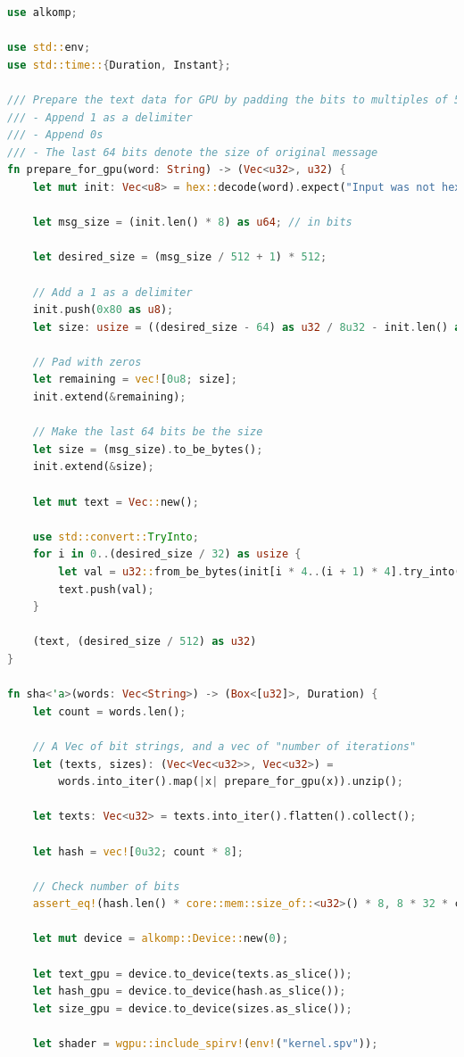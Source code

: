 \documentclass{article}
\begin{document}
\begin{lstlisting}[language=Rust, style=boxed]
use alkomp;

use std::env;
use std::time::{Duration, Instant};

/// Prepare the text data for GPU by padding the bits to multiples of 512
/// - Append 1 as a delimiter
/// - Append 0s
/// - The last 64 bits denote the size of original message
fn prepare_for_gpu(word: String) -> (Vec<u32>, u32) {
    let mut init: Vec<u8> = hex::decode(word).expect("Input was not hex");

    let msg_size = (init.len() * 8) as u64; // in bits

    let desired_size = (msg_size / 512 + 1) * 512;

    // Add a 1 as a delimiter
    init.push(0x80 as u8);
    let size: usize = ((desired_size - 64) as u32 / 8u32 - init.len() as u32) as usize;

    // Pad with zeros
    let remaining = vec![0u8; size];
    init.extend(&remaining);

    // Make the last 64 bits be the size
    let size = (msg_size).to_be_bytes();
    init.extend(&size);

    let mut text = Vec::new();

    use std::convert::TryInto;
    for i in 0..(desired_size / 32) as usize {
        let val = u32::from_be_bytes(init[i * 4..(i + 1) * 4].try_into().unwrap());
        text.push(val);
    }

    (text, (desired_size / 512) as u32)
}

fn sha<'a>(words: Vec<String>) -> (Box<[u32]>, Duration) {
    let count = words.len();

    // A Vec of bit strings, and a vec of "number of iterations"
    let (texts, sizes): (Vec<Vec<u32>>, Vec<u32>) =
        words.into_iter().map(|x| prepare_for_gpu(x)).unzip();

    let texts: Vec<u32> = texts.into_iter().flatten().collect();

    let hash = vec![0u32; count * 8];

    // Check number of bits
    assert_eq!(hash.len() * core::mem::size_of::<u32>() * 8, 8 * 32 * count);

    let mut device = alkomp::Device::new(0);

    let text_gpu = device.to_device(texts.as_slice());
    let hash_gpu = device.to_device(hash.as_slice());
    let size_gpu = device.to_device(sizes.as_slice());

    let shader = wgpu::include_spirv!(env!("kernel.spv"));


\end{lstlisting}
\end{document}
